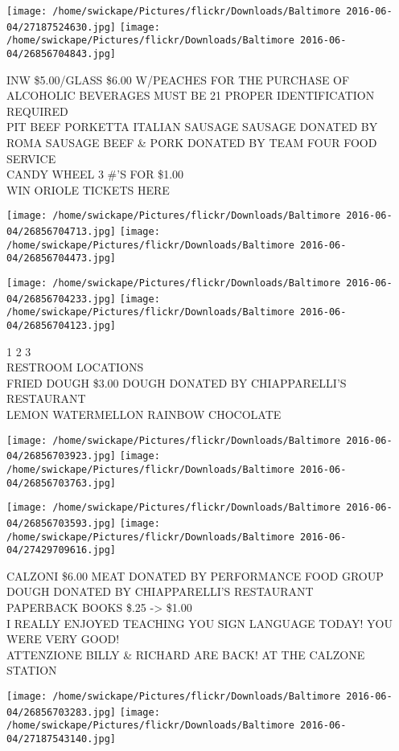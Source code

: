 \documentclass[10pt,letterpaper]{article}
\begin{document}
\texttt{[image: /home/swickape/Pictures/flickr/Downloads/Baltimore 2016-06-04/27187524630.jpg]}
\texttt{[image: /home/swickape/Pictures/flickr/Downloads/Baltimore 2016-06-04/26856704843.jpg]}

INW \$5.00/GLASS \$6.00 W/PEACHES FOR THE PURCHASE OF ALCOHOLIC BEVERAGES MUST BE 21 PROPER IDENTIFICATION REQUIRED\\
PIT BEEF PORKETTA ITALIAN SAUSAGE SAUSAGE DONATED BY ROMA SAUSAGE BEEF \& PORK DONATED BY TEAM FOUR FOOD SERVICE\\
CANDY WHEEL 3 \#'S FOR \$1.00\\
WIN ORIOLE TICKETS HERE
\pagebreak

\texttt{[image: /home/swickape/Pictures/flickr/Downloads/Baltimore 2016-06-04/26856704713.jpg]}
\texttt{[image: /home/swickape/Pictures/flickr/Downloads/Baltimore 2016-06-04/26856704473.jpg]}

\texttt{[image: /home/swickape/Pictures/flickr/Downloads/Baltimore 2016-06-04/26856704233.jpg]}
\texttt{[image: /home/swickape/Pictures/flickr/Downloads/Baltimore 2016-06-04/26856704123.jpg]}

1 2 3\\
RESTROOM LOCATIONS\\
FRIED DOUGH \$3.00 DOUGH DONATED BY CHIAPPARELLI'S RESTAURANT\\
LEMON WATERMELLON RAINBOW CHOCOLATE
\pagebreak

\texttt{[image: /home/swickape/Pictures/flickr/Downloads/Baltimore 2016-06-04/26856703923.jpg]}
\texttt{[image: /home/swickape/Pictures/flickr/Downloads/Baltimore 2016-06-04/26856703763.jpg]}

\texttt{[image: /home/swickape/Pictures/flickr/Downloads/Baltimore 2016-06-04/26856703593.jpg]}
\texttt{[image: /home/swickape/Pictures/flickr/Downloads/Baltimore 2016-06-04/27429709616.jpg]}

CALZONI \$6.00 MEAT DONATED BY PERFORMANCE FOOD GROUP DOUGH DONATED BY CHIAPPARELLI'S RESTAURANT\\
PAPERBACK BOOKS \$.25 {-}> \$1.00\\
I REALLY ENJOYED TEACHING YOU SIGN LANGUAGE TODAY!  YOU WERE VERY GOOD!\\
ATTENZIONE BILLY \& RICHARD ARE BACK! AT THE CALZONE STATION
\pagebreak

\texttt{[image: /home/swickape/Pictures/flickr/Downloads/Baltimore 2016-06-04/26856703283.jpg]}
\texttt{[image: /home/swickape/Pictures/flickr/Downloads/Baltimore 2016-06-04/27187543140.jpg]}
\end{document}
